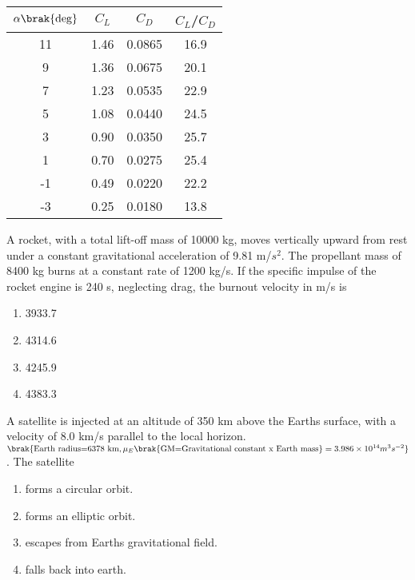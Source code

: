 	\begin{table}[H]
		\centering
		\begin{center}
			\begin{tabular}{|c|c|c|c|} 
				\hline
				$\alpha \brak{\text{deg}}$ & $C_L$ & $C_D$ & $C_L$/$C_D$ \\
				\hline
				11 & 1.46 & 0.0865 & 16.9 \\
				\hline
				9 & 1.36 & 0.0675 & 20.1 \\
				\hline
				7 & 1.23 & 0.0535 & 22.9 \\
				\hline
				5 & 1.08 & 0.0440 & 24.5 \\
				\hline
				3 & 0.90 & 0.0350 & 25.7 \\
				\hline
				1 & 0.70 & 0.0275 & 25.4 \\
				\hline
				-1 & 0.49 & 0.0220 & 22.2 \\
				\hline
				-3 & 0.25 & 0.0180 & 13.8 \\
				\hline
			\end{tabular}
		\end{center}
	\end{table}
\item A rocket, with a total lift-off mass of 10000 kg, moves vertically upward from rest under a constant gravitational acceleration of 9.81 m/$s^2$. The propellant mass of 8400 kg burns at a constant rate of 1200 kg/s. If the specific impulse of the rocket engine is 240 s, neglecting drag, the burnout velocity in m/s is
\begin{enumerate}
\item 3933.7
\item 4314.6
\item 4245.9
\item 4383.3
\end{enumerate}
\item A satellite is injected at an altitude of 350 km above the Earths surface, with a velocity of 8.0 km/s parallel to the local horizon. $\brak{\text{Earth radius=6378 km}, \mu_E \brak{\text{GM=Gravitational
	constant x Earth mass}} = 3.986\times10^{14} m^3s^{-2}} $. The satellite
\begin{enumerate}
\item forms a circular orbit.
\item forms an elliptic orbit.
\item escapes from Earths gravitational field.
\item falls back into earth.
\end{enumerate}

